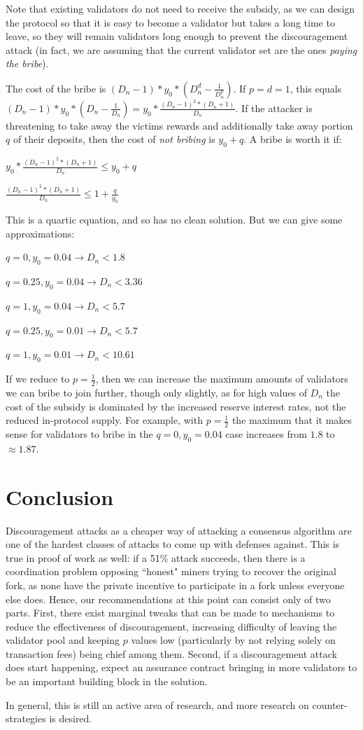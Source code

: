 \documentclass[12pt]{article}
\begin{document}
Note that existing validators do not need to receive the subsidy, as we can design the protocol so that it is easy to become a validator but takes a long time to leave, so they will remain validators long enough to prevent the discouragement attack (in fact, we are assuming that the current validator set are the ones \textit{paying the bribe}).

The cost of the bribe is $(D_n - 1) * y_0 * (D_n^d - \frac{1}{D_n^p})$. If $p = d = 1$, this equals $(D_n - 1) * y_0 * (D_n - \frac{1}{D_n}) = y_0 * \frac{(D_n-1)^2 * (D_n+1)}{D_n}$. If the attacker is threatening to take away the victims rewards and additionally take away portion $q$ of their deposits, then the cost of \textit{not bribing} is $y_0 + q$. A bribe is worth it if:

$y_0 * \frac{(D_n-1)^2 * (D_n+1)}{D_n} \le y_0 + q$

$\frac{(D_n-1)^2 * (D_n+1)}{D_n} \le 1 + \frac{q}{y_0}$

This is a quartic equation, and so has no clean solution. But we can give some approximations:

$q = 0, y_0 = 0.04 \rightarrow D_n < 1.8$

$q = 0.25, y_0 = 0.04 \rightarrow D_n < 3.36$

$q = 1, y_0 = 0.04 \rightarrow D_n < 5.7$

$q = 0.25, y_0 = 0.01 \rightarrow D_n < 5.7$

$q = 1, y_0 = 0.01 \rightarrow D_n < 10.61$

If we reduce to $p = \frac{1}{2}$, then we can increase the maximum amounts of validators we can bribe to join further, though only slightly, as for high values of $D_n$ the cost of the subsidy is dominated by the increased reserve interest rates, not the reduced in-protocol supply. For example, with $p = \frac{1}{2}$ the maximum that it makes sense for validators to bribe in the $q = 0, y_0 = 0.04$ case increases from $1.8$ to $\approx 1.87$.

\section{Conclusion}

Discouragement attacks as a cheaper way of attacking a consensus algorithm are one of the hardest classes of attacks to come up with defenses against. This is true in proof of work as well: if a 51\% attack succeeds, then there is a coordination problem opposing ``honest" miners trying to recover the original fork, as none have the private incentive to participate in a fork unless everyone else does. Hence, our recommendations at this point can consist only of two parts. First, there exist marginal tweaks that can be made to mechanisms to reduce the effectiveness of discouragement, increasing difficulty of leaving the validator pool and keeping $p$ values low (particularly by not relying solely on transaction fees) being chief among them. Second, if a discouragement attack does start happening, expect an assurance contract bringing in more validators to be an important building block in the solution.

In general, this is still an active area of research, and more research on counter-strategies is desired.



\end{document}
